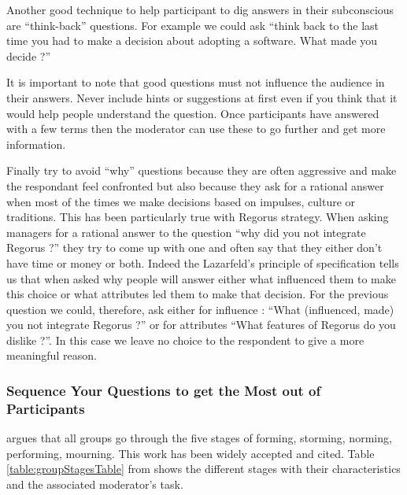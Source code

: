 \documentclass[10pt]{report}
\begin{document}
Another good technique to help participant to dig answers in their subconscious are \enquote{think-back} questions. For example we could ask \enquote{think back to the last time you had to make a decision about adopting a software. What made you decide ?}

It is important to note that good questions must not influence the audience in their answers. Never include hints or suggestions at first even if you think that it would help people understand the question. Once participants have answered with a few terms then the moderator can use these to go further and get more information.

Finally try to avoid \enquote{why} questions because they are often aggressive and make the respondant feel confronted but also because they ask for a rational answer when most of the times we make decisions based on impulses, culture or traditions. This has been particularly true with Regorus strategy. When asking managers for a rational answer to the question \enquote{why did you not integrate Regorus ?} they try to come up with one and often say that they either don't have time or money or both. Indeed the Lazarfeld's principle of specification \autocite{Lazarfeld1935} tells us that when asked why people will answer either what influenced them to make this choice or what attributes led them to make that decision. For the previous question we could, therefore, ask either for influence : \enquote{What (influenced, made) you not integrate Regorus ?} or for attributes \enquote{What features of Regorus do you dislike ?}. In this case we leave no choice to the respondent to give a more meaningful reason.

\subsubsection{Sequence Your Questions to get the Most out of Participants}
\autocite{tuckman1965} argues that all groups go through the five stages of forming, storming, norming, performing, mourning. This work has been widely accepted and cited. Table \ref{table:groupStagesTable} from \autocite{belk2007handbook} shows the different stages with their characteristics and the associated moderator's task.
\end{document}
